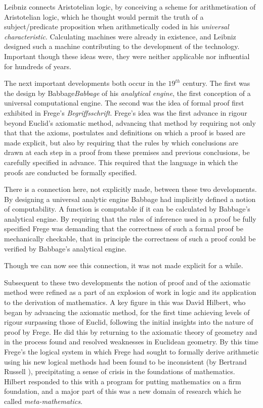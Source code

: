 Leibniz connects Aristotelian logic, by conceiving a scheme for
arithmetisation of Aristotelian logic, which he thought would permit
the truth of a subject/predicate proposition when arithmetically coded
in his \emph{universal characteristic}.
Calculating machines were already in existence, and Leibniz designed
such a machine contributing to the development of the technology.
Important though these ideas were, they were neither applicable nor
influential for hundreds of years.

The next important developments both occur in the $19^{th}$ century.
The first was the design by Babbage\emph{Babbage} of his
\emph{analytical engine}, the first
conception of a universal computational engine. 
The second was the idea of formal proof first exhibited in Frege's
\emph{Begriffsschrift}\cite{frege1879}.
Frege's idea was the first advance in rigour beyond Euclid's axiomatic
method, advancing that method by requiring not only that that the
axioms, postulates and definitions on which a proof is based are made
explicit, but also by requiring that the rules by which conclusions
are drawn at each step in a proof from these premises and previous
conclusions, be carefully specified in advance.
This required that the language in which the proofs are conducted be
formally specified.

There is a connection here, not explicitly made, between these two
developments.
By designing a universal analytic engine Babbage had implicitly
defined a notion of computability.
A function is computable if it can be calculated by Babbage's
analytical engine.
By requiring that the rules of inference used in a proof be fully
specified Frege was demanding that the correctness of such a formal
proof be mechanically checkable, that in principle the correctness of
such a proof could be verified by Babbage's analytical engine.

Though we can now see this connection, it was not made explicit for a
while.

Subsequent to these two developments the notion of proof and of the
axiomatic method were refined as a part of an explosion of work in
logic and its application to the derivation of mathematics.
A key figure in this was David Hilbert, who began by advancing the
axiomatic method, for the first time achieving levels of rigour
surpassing those of Euclid, following the initial insights into the
nature of proof by Frege.
He did this by returning to the axiomatic theory of geometry and in
the process found and resolved weaknesses in Euclidean geometry.
By this time Frege's the logical system in which Frege had sought to
formally derive arithmetic using his new logical methods had been
found to be inconsistent (by Bertrand Russell ),
 precipitating a sense of crisis in the foundations of mathematics.
Hilbert responded to this with a program for putting mathematics on
a firm foundation, and a major part of this was a new domain of
research which he called
\emph{meta-mathematics}.


